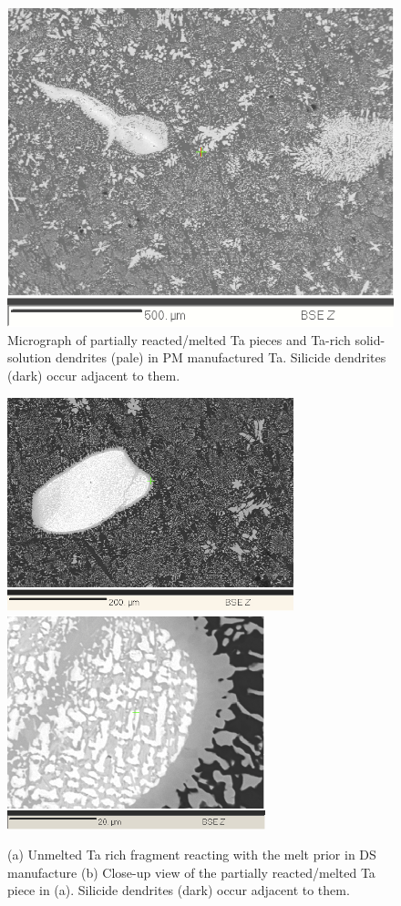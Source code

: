 %
\begin{landscape}
\begin{figure}[htbp]
\begin{center}
\includegraphics[width=17cm]{manual_15_viii}
\caption{ Micrograph of partially reacted/melted Ta pieces and Ta-rich solid-solution dendrites (pale) in PM manufactured Ta.  Silicide dendrites (dark) occur adjacent to them.}
\label{fig:unmeltedii}
\end{center}
\end{figure}
\end{landscape}
%
%
\begin{figure}[htbp]
\begin{center}
\includegraphics[width=8.3cm]{lump}
\includegraphics[width=7.5cm]{manual_15_iii}
\caption{(a) Unmelted Ta rich fragment reacting with the melt prior in DS manufacture (b) Close-up view of the partially reacted/melted Ta piece in (a).  Silicide dendrites (dark) occur adjacent to them.}
\label{fig:lump}
\end{center}
\end{figure}
